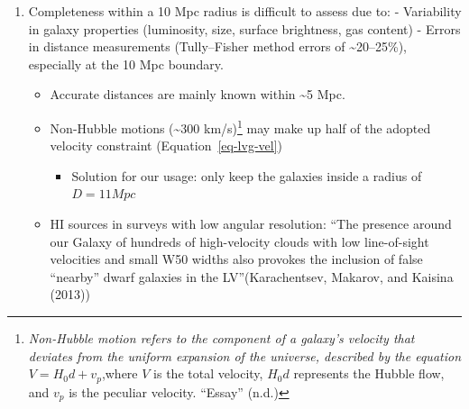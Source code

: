 \documentclass[
]{article}
\providecommand{\tightlist}{%
  \setlength{\itemsep}{0pt}\setlength{\parskip}{0pt}}\usepackage{longtable,booktabs,array}
\begin{document}
\begin{enumerate}
\def\labelenumi{\arabic{enumi}.}
\tightlist
\item
  Completeness within a 10 Mpc radius is difficult to assess due to: -
  Variability in galaxy properties (luminosity, size, surface
  brightness, gas content) - Errors in distance measurements
  (Tully--Fisher method errors of \textasciitilde20--25\%), especially
  at the 10 Mpc boundary.

  \begin{itemize}
  \tightlist
  \item
    Accurate distances are mainly known within \textasciitilde5 Mpc.
  \item
    Non-Hubble motions (\textasciitilde300 km/s)\footnote{\emph{Non-Hubble
      motion refers to the component of a galaxy's velocity that
      deviates from the uniform expansion of the universe, described by
      the equation} \(V= H_0 d + v_p\),where \(V\) is the total
      velocity, \(H_0 d\) represents the Hubble flow, and
      \(v_p\)\hspace{0pt} is the peculiar velocity. {``Essay''} (n.d.)}
    may make up half of the adopted velocity constraint
    (Equation~\ref{eq-lvg-vel})

    \begin{itemize}
    \tightlist
    \item
      Solution for our usage: only keep the galaxies inside a radius of
      \(D=11 Mpc\)
    \end{itemize}
  \item
    HI sources in surveys with low angular resolution: ``The presence
    around our Galaxy of hundreds of high-velocity clouds with low
    line-of-sight velocities and small W50 widths also provokes the
    inclusion of false ``nearby'' dwarf galaxies in the
    LV''(Karachentsev, Makarov, and Kaisina (2013))
  \end{itemize}
\end{enumerate}
\end{document}

